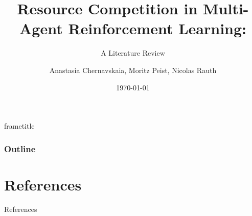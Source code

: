 \documentclass{beamer}
\title{Resource Competition in Multi-Agent Reinforcement Learning:}
\subtitle{A Literature Review}
\date{\centering\today}
\author{\centering Anastasia Chernavskaia, Moritz Peist, Nicolas Rauth}
\institute{\centering}
\begin{document}
    \begin{frame}{}
        \titlepage
    \end{frame}
    {
        \nointerlineskip
        \begin{beamercolorbox}[sep=0.3cm,wd=\paperwidth]{frametitle}
            \strut\insertframetitle\strut
            \hfill
            \raisebox{-0.8mm}{}
        \end{beamercolorbox}
    }

    \begin{frame}
        \frametitle{Outline}
        \tableofcontents
    \end{frame}

    

  
    \section{References}
    
    \begin{frame}[allowframebreaks]{References}
        \printbibliography[heading=none]
    \end{frame}
    
\end{document}
